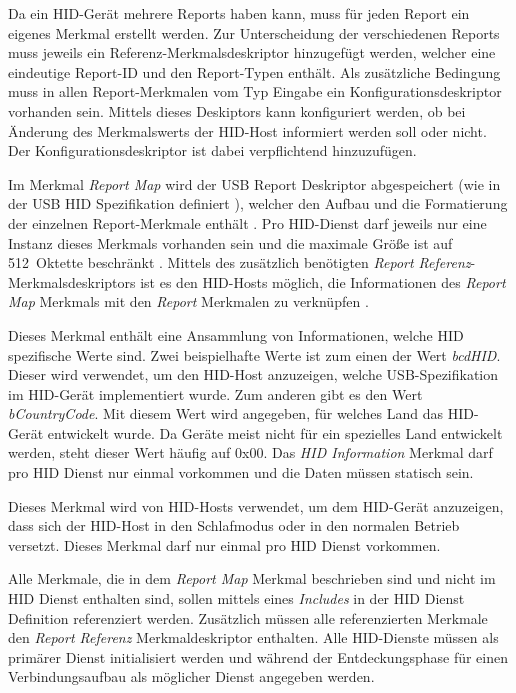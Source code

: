 Da ein \acs{HID}-Gerät mehrere Reports haben kann, muss für jeden Report ein eigenes Merkmal erstellt werden. Zur Unterscheidung der verschiedenen Reports muss jeweils ein Referenz-Merkmalsdeskriptor hinzugefügt werden, welcher eine eindeutige Report-ID und den Report-Typen enthält. Als zusätzliche Bedingung muss in allen Report-Merkmalen vom Typ Eingabe ein Konfigurationsdeskriptor vorhanden sein. Mittels dieses Deskiptors kann konfiguriert werden, ob bei Änderung des Merkmalswerts der \acs{HID}-Host informiert werden soll oder nicht. Der Konfigurationsdeskriptor ist dabei verpflichtend hinzuzufügen. \cite[S.~14.f]{bluetoothHIDS}

Im Merkmal \textit{Report Map} wird der USB Report Deskriptor abgespeichert (wie in der USB \acs{HID} Spezifikation definiert \cite[S.~21]{bluetoothHOGP}), welcher den Aufbau und die Formatierung der einzelnen Report-Merkmale enthält \cite[S.~11]{bluetoothHIDS}. Pro \acs{HID}-Dienst darf jeweils nur eine Instanz dieses Merkmals vorhanden sein und die maximale Größe ist auf 512~Oktette beschränkt \cite[S.~16]{bluetoothHIDS}. Mittels des zusätzlich benötigten \textit{Report Referenz}-Merkmalsdeskriptors ist es den \acs{HID}-Hosts möglich, die Informationen des \textit{Report Map} Merkmals mit den \textit{Report} Merkmalen zu verknüpfen \cite[S.~17]{bluetoothHIDS}.

Dieses Merkmal enthält eine Ansammlung von Informationen, welche \acs{HID} spezifische Werte sind. Zwei beispielhafte Werte ist zum einen der Wert \textit{bcdHID}. Dieser wird verwendet, um den \acs{HID}-Host anzuzeigen, welche USB-Spezifikation im \acs{HID}-Gerät implementiert wurde. Zum anderen gibt es den Wert \textit{bCountryCode}. Mit diesem Wert wird angegeben, für welches Land das \acs{HID}-Gerät entwickelt wurde. Da Geräte meist nicht für ein spezielles Land entwickelt werden, steht dieser Wert häufig auf 0x00. Das \textit{\acs{HID} Information} Merkmal darf pro \acs{HID} Dienst nur einmal vorkommen und die Daten müssen statisch sein. \cite[S.~20f.]{bluetoothHIDS}

Dieses Merkmal wird von \acs{HID}-Hosts verwendet, um dem \acs{HID}-Gerät anzuzeigen, dass sich der \acs{HID}-Host in den Schlafmodus oder in den normalen Betrieb versetzt. Dieses Merkmal darf nur einmal pro \acs{HID} Dienst vorkommen. \cites[S.~23]{bluetoothHOGP}[S.~21]{bluetoothHIDS}

Alle Merkmale, die in dem \textit{Report Map} Merkmal beschrieben sind und nicht im \acs{HID} Dienst enthalten sind, sollen mittels eines \textit{Includes} in der \acs{HID} Dienst Definition referenziert werden. Zusätzlich müssen alle referenzierten Merkmale den \textit{Report Referenz} Merkmaldeskriptor enthalten. Alle \acs{HID}-Dienste müssen als primärer Dienst initialisiert werden und während der Entdeckungsphase für einen Verbindungsaufbau als möglicher Dienst angegeben werden. \cite[S.~13f.]{bluetoothHOGP}

